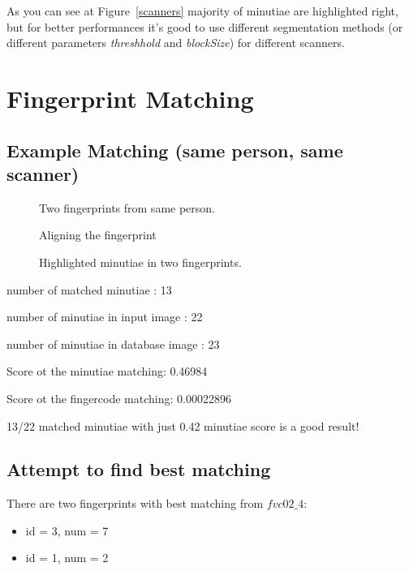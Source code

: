 \documentclass{article}
\begin{document}
As you can see at Figure~\ref{scanners} majority of minutiae are highlighted right, but for better performances it's good to use different segmentation methods (or different parameters \textit{threshhold} and \textit{blockSize}) for different scanners.

\newpage
\section{Fingerprint Matching}
\subsection{Example Matching (same person, same scanner)}

\begin{figure}[htbp]
  \centering
  \def\svgscale{0.3}
  
  \caption{Two fingerprints from same person.}
\end{figure}

\begin{figure}[htbp]
  \centering
  \def\svgscale{0.5}
  
  \caption{Aligning the fingerprint}
\end{figure}

\begin{figure}[htbp]
  \def\svgscale{0.5}
  
  \def\svgscale{0.5}
  
  \caption{Highlighted minutiae in two fingerprints.}
\end{figure}

\newpage
number of matched minutiae : 13

number of minutiae in input image : 22

number of minutiae in database image : 23
 
Score ot the minutiae matching: 0.46984

Score ot the fingercode matching: 0.00022896

13/22 matched minutiae with just 0.42 minutiae score is a good result!

\subsection{Attempt to find best matching}

There are two fingerprints with best matching from \(fvc02\_4\):
\begin{itemize}
  \item id = 3, num = 7
  \item id = 1, num = 2
\end{itemize}
\end{document}
